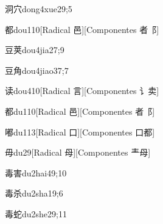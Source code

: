 \begin{verbete}{洞穴}{dong4xue2}{9;5}
\end{verbete}

\begin{verbete}{都}{dou1}{10}[Radical 邑][Componentes 者⻏]
\end{verbete}

\begin{verbete}{豆荚}{dou4jia2}{7;9}
\end{verbete}

\begin{verbete}{豆角}{dou4jiao3}{7;7}
\end{verbete}

\begin{verbete}{读}{dou4}{10}[Radical 言][Componentes ⻈卖]
\end{verbete}

\begin{verbete}{都}{du1}{10}[Radical 邑][Componentes 者⻏]
\end{verbete}

\begin{verbete}{嘟}{du1}{13}[Radical ⼝][Componentes ⼝都]
\end{verbete}

\begin{verbete}{毋}{du2}{9}[Radical ⺟][Componentes 龶⺟]
\end{verbete}

\begin{verbete}{毒害}{du2hai4}{9;10}
\end{verbete}

\begin{verbete}{毒杀}{du2sha1}{9;6}
\end{verbete}

\begin{verbete}{毒蛇}{du2she2}{9;11}
\end{verbete}

